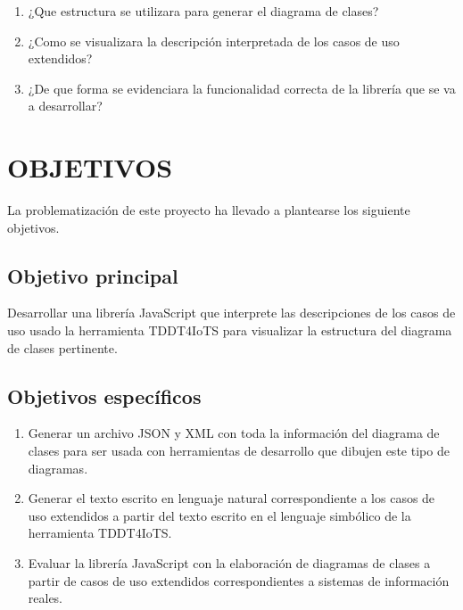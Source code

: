 \documentclass[12pt,a4paper,final]{article}
\begin{document}
	\begin{enumerate}
		\item ¿Que estructura se utilizara para generar el diagrama de clases?
		
		\item ¿Como se visualizara la descripción interpretada de los casos de uso extendidos?
		
		\item ¿De que forma se evidenciara la funcionalidad correcta de la librería que se va a desarrollar?
	\end{enumerate}
	
	\section{OBJETIVOS}
	
	La problematización de este proyecto ha llevado a plantearse los siguiente objetivos.
	
	\subsection{Objetivo principal}
	
	Desarrollar una librería JavaScript que interprete las descripciones de los casos de uso usado la herramienta TDDT4IoTS para visualizar la estructura del diagrama de clases pertinente. 
	
	\subsection{Objetivos específicos}
	
	\begin{enumerate}
		
		\item Generar un archivo JSON y XML con toda la información del
		diagrama de clases para ser usada con herramientas de desarrollo que dibujen este tipo de diagramas.
		
		\item Generar el texto escrito en lenguaje natural correspondiente a los casos de uso extendidos a partir del texto escrito en el lenguaje simbólico de la herramienta TDDT4IoTS.
		
		\item Evaluar la librería JavaScript con la elaboración de diagramas de clases a partir de casos de uso extendidos correspondientes a sistemas de información reales.
	\end{enumerate}
	
\end{document}
